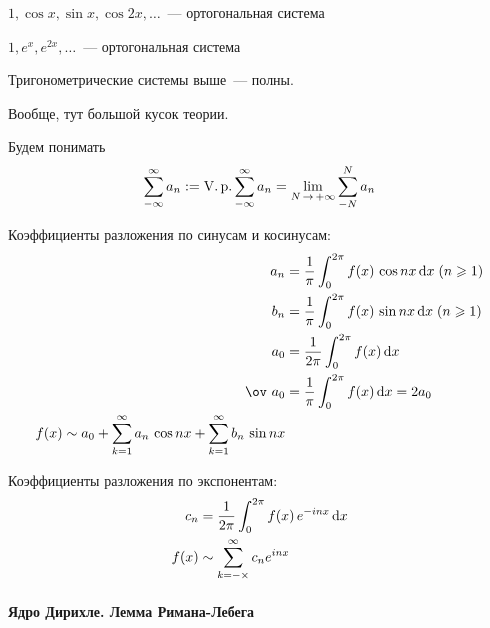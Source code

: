 \documentclass[12pt,draft,timbord]{longnotes}
\begin{document}
\begin{prop}\label{prop:fourier::trigseries::orthsin}
  $1, \cos x, \sin x, \cos 2x, \dotsc $~--- ортогональная система
\end{prop}
\begin{prop}\label{prop:fourier::trigseries::orthexp}
  $1, e^x, e^{2x}, \dotsc $~--- ортогональная система
\end{prop}

\begin{thrm}\label{thrm:fourier::trigseries::comp}
  Тригонометрические системы выше~--- полны.
\end{thrm}
\begin{tproof}
  \quest Вообще, тут большой кусок теории.
\end{tproof}

\begin{defn}\label{defn:fourier::trigseries::vp}
  Будем понимать 
  \[
    \sum_{-\infty}^\infty a_n := \Vp \sum_{-\infty}^\infty a_n 
    = \lim_{N\to +\infty}  \sum_{-N}^N a_n
  \]
\end{defn}

\begin{prop}\label{prop:fourier::trigseries::sin}
  Коэффициенты разложения по синусам и косинусам:
   \begin{align*}
     a_n &= \frac{1}{\pi} \int_0^{2\pi} f(x) \, \cos nx \, \del x \; (n \geqslant 1)\\ 
     b_n &= \frac{1}{\pi} \int_0^{2\pi} f(x) \, \sin nx \, \del x \; (n \geqslant 1)\\ 
     a_0 &= \frac{1}{2\pi} \int_0^{2\pi} f(x) \, \del x \\ 
     \ov~{a_0} &= \frac{1}{\pi} \int_0^{2\pi} f(x) \, \del x  = 2 a_0\\ 
     f(x) \sim a_0 + \sum_{k=1}^\infty a_n \, \cos nx + \sum_{k=1}^\infty b_n \, \sin nx  
   \end{align*}
\end{prop}
\begin{prop}\label{prop:fourier::trigseries::exp}
  Коэффициенты разложения по экспонентам:
   \begin{align*}
     c_n &= \frac{1}{2\pi} \int_0^{2\pi} f(x) \, e^{-inx} \, \mathrm{d} x \\ 
     f(x) &\sim \sum_{k=-\times}^\infty c_n  e^{inx}
   \end{align*}
\end{prop}

\paragraph{Ядро Дирихле. Лемма Римана-Лебега}
\label{par:fourier::dirker}
\end{document}
